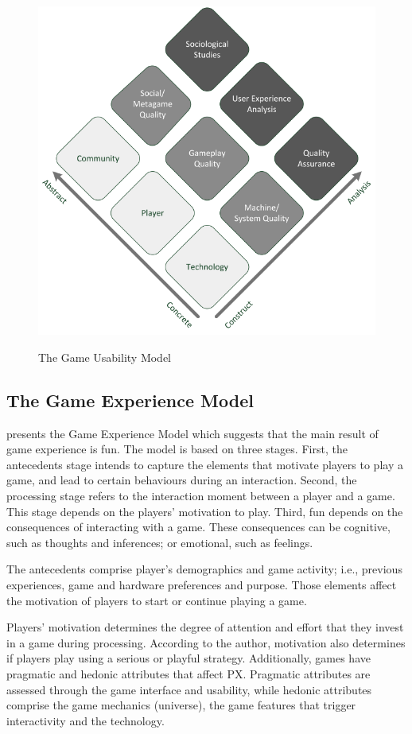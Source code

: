 \begin{figure}[bth]
\myfloatalign
{\includegraphics[width=.7\linewidth]{gfx/model/game_usa_model}} \quad
\caption[The Game Usability Model]{The Game Usability Model \autocite{Nacked}}\label{fig:game_usa_model}
\end{figure}

\subsection{The Game Experience Model}
\textcite{Fernandez2008} presents the Game Experience Model which suggests that the main result of game experience is fun. The model is based on three stages. First, the antecedents stage intends to capture the elements that motivate players to play a game, and lead to certain behaviours during an interaction. Second, the processing stage refers to the interaction moment between a player and a game. This stage depends on the players' motivation to play. Third, fun depends on the consequences of interacting with a game. These consequences can be cognitive, such as thoughts and inferences; or emotional, such as feelings.

The antecedents comprise player's demographics and game activity; i.e., previous experiences, game and hardware preferences and purpose. Those elements affect the motivation of players to start or continue playing a game.

Players' motivation determines the degree of attention and effort that they invest in a game during processing. According to the author, motivation also determines if players play using a serious or playful strategy. Additionally, games have pragmatic and hedonic attributes that affect \ac{PX}. Pragmatic attributes are assessed through the game interface and usability, while hedonic attributes comprise the game mechanics (universe), the game features that trigger interactivity and the technology.

